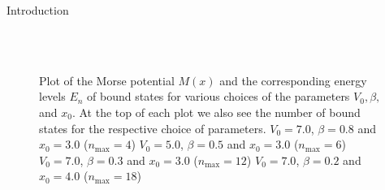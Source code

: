 \begin{chapter}{Introduction}
\begin{figure}[h!]
    \centering
    \\
    \\

       \caption[Morse potential state energy levels]{Plot of the Morse potential $M(x)$ and the corresponding
    energy levels $E_n$ of bound states for various choices of the parameters $V_0, \beta,$ and $x_0$. At the top
    of each plot we also see the number of bound states for the respective choice of parameters.
     $V_0=7.0$, $\beta=0.8$ and $x_0=3.0$ ($n_{\text{max}}=4$)
     $V_0=5.0$, $\beta=0.5$ and $x_0=3.0$ ($n_{\text{max}}=6$)
     $V_0=7.0$, $\beta=0.3$ and $x_0=3.0$ ($n_{\text{max}}=12$)
     $V_0=7.0$, $\beta=0.2$ and $x_0=4.0$ ($n_{\text{max}}=18$)
    \label{fig:MorsePlots}
    }


\end{figure}
\end{chapter}
